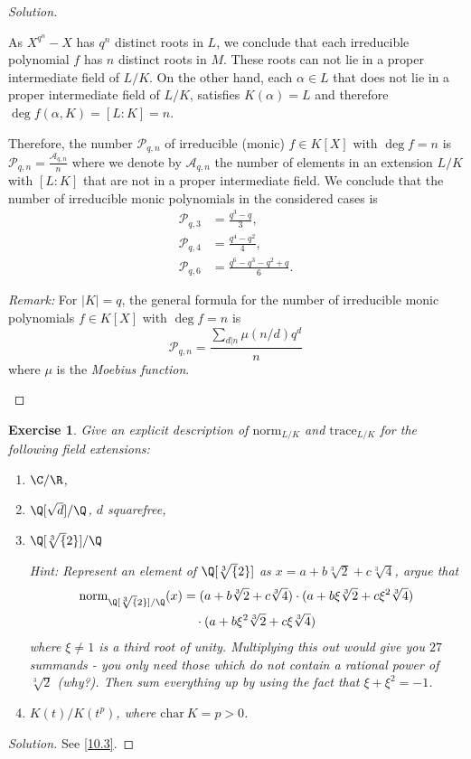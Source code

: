 \documentclass[a4paper,10pt,reqno]{amsart}
\newtheorem{ex}{Exercise}[section]
\newenvironment{sol}
  {\renewcommand\qedsymbol{$\blacksquare$}\begin{proof}[Solution]}
  {\end{proof}}
\begin{document}
\begin{sol}
\begin{enumerate}[label=(\roman*)]
    As $X^{q^n}-X$ has $q^n$ distinct roots in $L$, we conclude that each irreducible polynomial $f$ has $n$ distinct roots in $M$. These roots can not lie in a proper intermediate field of $L/K$. On the other hand, each $\alpha \in L$ that does not lie in a proper intermediate field of $L/K$, satisfies $K(\alpha) = L$ and therefore $\deg f(\alpha,K) = [L:K]= n$.

    Therefore, the number $\mathcal{P}_{q,n}$ of irreducible (monic) $f \in K[X]$ with $\deg f = n$ is $\mathcal{P}_{q,n} = \frac{\mathcal{A}_{q,n}}{n}$ where we denote by $\mathcal{A}_{q,n}$ the number of elements in an extension $L/K$ with $[L:K]$ that are not in a proper intermediate field. We conclude that the number of irreducible monic polynomials in the considered cases is
    \begin{align*}
        \mathcal{P}_{q,3} & = \frac{q^3 - q}{3},\\
        \mathcal{P}_{q,4} & = \frac{q^4 - q^2}{4}, \\
        \mathcal{P}_{q,6} & = \frac{q^6 - q^3 - q^2 + q}{6} .
    \end{align*}

    \medskip

    \noindent \textit{Remark:} For $|K| = q$, the general formula for the number of irreducible monic polynomials $f \in K[X]$ with $\deg f = n$ is
    \[
    \mathcal{P}_{q,n} = \frac{\sum_{d|n}\mu(n/d)q^d}{n}
    \]
    where $\mu$ is the \emph{Moebius function}.
    \end{enumerate}
\end{sol}

\begin{ex}
\label{9.3}
    Give an explicit description of $\mathrm{norm}_{L/K}$ and $\mathrm{trace}_{L/K}$ for the following field extensions:
    \begin{enumerate}[label=(\roman*)]
        \item $\C/\R$,
        \item $\Q[\sqrt{d}]/\Q$, $d$ squarefree,
        \item $\Q[\sqrt[3]{2}]/\Q$

        \noindent \textit{Hint:} Represent an element of $\Q[\sqrt[3]{2}]$ as $x = a + b \sqrt[3]{2} + c \sqrt[3]{4}$, argue that
        \begin{align*}
        \mathrm{norm}_{\Q[\sqrt[3]{2}]/\Q}(x) & = (a + b \sqrt[3]{2} + c \sqrt[3]{4}) \cdot (a + b\xi \sqrt[3]{2} + c\xi^2 \sqrt[3]{4}) \\
        & \quad \cdot (a + b\xi^2 \sqrt[3]{2} + c \xi\sqrt[3]{4})
        \end{align*}
        where $\xi \neq 1$ is a third root of unity. Multiplying this out would give you $27$ summands - you only need those which do not contain a rational power of $\sqrt[3]{2}$ (why?). Then sum everything up by using the fact that $\xi + \xi^2 = -1$.
        \item $K(t)/K(t^p)$, where $\mathrm{char}\ K = p > 0$.
    \end{enumerate}
\end{ex}
\begin{sol}
    See \cref{10.3}.
\end{sol}
\end{document}
